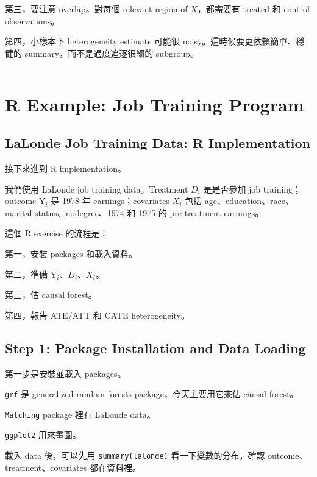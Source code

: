 \documentclass[
  chinese,
  11pt,
]{article}
\begin{document}
第三，要注意 overlap。對每個 relevant region of \(X\)，都需要有 treated
和 control observations。

第四，小樣本下 heterogeneity estimate 可能很
noisy。這時候要更依賴簡單、穩健的 summary，而不是過度追逐很細的
subgroup。

\begin{center}\rule{0.5\linewidth}{0.5pt}\end{center}

\section{R Example: Job Training
Program}\label{r-example-job-training-program}

\subsection{LaLonde Job Training Data: R
Implementation}\label{lalonde-job-training-data-r-implementation}

接下來進到 R implementation。

我們使用 LaLonde job training data。Treatment \(D_i\) 是是否參加 job
training；outcome \(\mathrm{Y}_i\) 是 1978 年 earnings；covariates
\(X_i\) 包括 age、education、race、marital status、nodegree、1974 和
1975 的 pre-treatment earnings。

這個 R exercise 的流程是：

第一，安裝 packages 和載入資料。

第二，準備 \(\mathrm{Y}_i\)、\(D_i\)、\(X_i\)。

第三，估 causal forest。

第四，報告 ATE/ATT 和 CATE heterogeneity。

\subsection{Step 1: Package Installation and Data
Loading}\label{step-1-package-installation-and-data-loading}

第一步是安裝並載入 packages。

\texttt{grf} 是 generalized random forests package，今天主要用它來估
causal forest。

\texttt{Matching} package 裡有 LaLonde data。

\texttt{ggplot2} 用來畫圖。

載入 data 後，可以先用 \texttt{summary(lalonde)} 看一下變數的分布，確認
outcome、treatment、covariates 都在資料裡。
\end{document}
